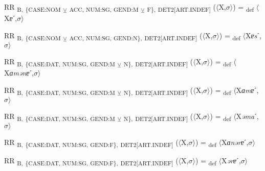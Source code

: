 {\begin{exe}
 RR \textsubscript{B,} \textsubscript{\{CASE:NOM} \textsubscript{${\veebar}$}\textsubscript{ ACC, NUM:SG, GEND:M} \textsubscript{${\veebar}$}\textsubscript{ F\},} \textsubscript{DET2[ART.INDEF]} ($\langle$X,$\sigma $$\rangle$) = \textsubscript{def} $\langle$X\textit{ɐ}ˊ,$\sigma $$\rangle$
\end{exe}

\begin{exe}
 RR \textsubscript{B,} \textsubscript{\{CASE:NOM} \textsubscript{${\veebar}$}\textsubscript{ ACC, NUM:SG, GEND:N\},} \textsubscript{DET2[ART.INDEF]} ($\langle$X,$\sigma $$\rangle$) = \textsubscript{def} $\langle$X\textit{ɐs}ˊ,$\sigma $$\rangle$
\end{exe}

\begin{exe}
 RR \textsubscript{B,} \textsubscript{\{CASE:DAT, NUM:SG, GEND:M} \textsubscript{${\veebar}$}\textsubscript{ N\},} \textsubscript{DET2[ART.INDEF]} ($\langle$X,$\sigma $$\rangle$) = \textsubscript{def} $\langle$X\textit{ɑmənɐ}ˊ,$\sigma $$\rangle$
\end{exe}

\begin{exe}
 RR \textsubscript{B,} \textsubscript{\{CASE:DAT, NUM:SG, GEND:M} \textsubscript{${\veebar}$}\textsubscript{ N\},} \textsubscript{DET2[ART.INDEF]} ($\langle$X,$\sigma $$\rangle$) = \textsubscript{def} $\langle$X\textit{ɑmɐ}ˊ,$\sigma $$\rangle$
\end{exe}

\begin{exe}
 RR \textsubscript{B,} \textsubscript{\{CASE:DAT, NUM:SG, GEND:M} \textsubscript{${\veebar}$}\textsubscript{ N\},} \textsubscript{DET2[ART.INDEF]} ($\langle$X,$\sigma $$\rangle$) = \textsubscript{def} $\langle$X\textit{əma}ˊ,$\sigma $$\rangle$
\end{exe}

\begin{exe}
 RR \textsubscript{B,} \textsubscript{\{CASE:DAT, NUM:SG, GEND:F\},} \textsubscript{DET2[ART.INDEF]} ($\langle$X,$\sigma $$\rangle$) = \textsubscript{def} $\langle$X\textit{ɑnərɐ}ˊ,$\sigma $$\rangle$
\end{exe}

\begin{exe}
 RR \textsubscript{B,} \textsubscript{\{CASE:DAT, NUM:SG, GEND:F\},} \textsubscript{DET2[ART.INDEF]} ($\langle$X,$\sigma $$\rangle$) = \textsubscript{def} $\langle$X\textit{ərɐ}ˊ,$\sigma $$\rangle$
\end{exe}

}

